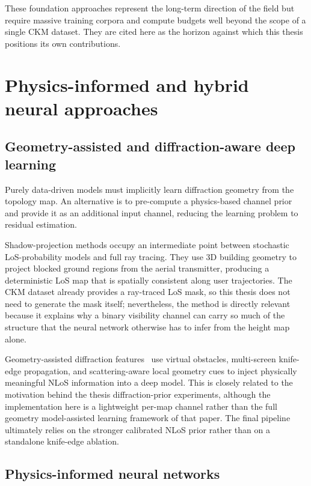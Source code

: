 These foundation approaches represent the long-term direction of the field but
require massive training corpora and compute budgets well beyond the scope of a
single CKM dataset.  They are cited here as the horizon against which this thesis
positions its own contributions.

\section{Physics-informed and hybrid neural approaches}
\label{sec:soa_physics}

\subsection{Geometry-assisted and diffraction-aware deep learning}

Purely data-driven models must implicitly learn diffraction geometry from the
topology map.  An alternative is to pre-compute a physics-based channel prior and
provide it as an additional input channel, reducing the learning problem to
residual estimation.

Shadow-projection methods \cite{vinogradov2026shadow} occupy an intermediate
point between stochastic LoS-probability models and full ray tracing. They use
3D building geometry to project blocked ground regions from the aerial
transmitter, producing a deterministic LoS map that is spatially consistent
along user trajectories. The CKM dataset already provides a ray-traced LoS
mask, so this thesis does not need to generate the mask itself; nevertheless,
the method is directly relevant because it explains why a binary visibility
channel can carry so much of the structure that the neural network otherwise
has to infer from the height map alone.

Geometry-assisted diffraction features~\cite{geomDL2024} use virtual obstacles,
multi-screen knife-edge propagation, and scattering-aware local geometry cues to
inject physically meaningful NLoS information into a deep model.  This is
closely related to the motivation behind the thesis diffraction-prior
experiments, although the implementation here is a lightweight per-map channel
rather than the full geometry model-assisted learning framework of that paper.
The final pipeline ultimately relies on the stronger calibrated NLoS prior
rather than on a standalone knife-edge ablation.

\subsection{Physics-informed neural networks}

